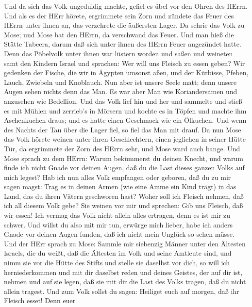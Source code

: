  Und da sich das Volk ungeduldig machte, gefiel es übel vor
den Ohren des HErrn. Und als es der HErr hörete, ergrimmete sein Zorn
und zündete das Feuer des HErrn unter ihnen an, das verzehrete die
äußersten Lager.  Da schrie das Volk zu Mose; und Mose bat
den HErrn, da verschwand das Feuer.  Und man hieß die Stätte
Tabeera, darum daß sich unter ihnen des HErrn Feuer angezündet hatte.
 Denn das Pöbelvolk unter ihnen war lüstern worden und saßen
und weineten samt den Kindern Israel und sprachen: Wer will uns Fleisch
zu essen geben?  Wir gedenken der Fische, die wir in Ägypten
umsonst aßen, und der Kürbisse, Pfeben, Lauch, Zwiebeln und Knoblauch.
 Nun aber ist unsere Seele matt; denn unsere Augen sehen
nichts denn das Man.  Es war aber Man wie Koriandersamen und
anzusehen wie Bedellion.  Und das Volk lief hin und her und
sammelte und stieß es mit Mühlen und zerrieb's in Mörsern und kochte es
in Töpfen und machte ihm Aschenkuchen draus; und es hatte einen
Geschmack wie ein Ölkuchen.  Und wenn des Nachts der Tau
über die Lager fiel, so fiel das Man mit drauf.  Da nun
Mose das Volk hörete weinen unter ihren Geschlechtern, einen jeglichen
in seiner Hütte Tür, da ergrimmete der Zorn des HErrn sehr, und Mose
ward auch bange.  Und Mose sprach zu dem HErrn: Warum
bekümmerst du deinen Knecht, und warum finde ich nicht Gnade vor deinen
Augen, daß du die Last dieses ganzen Volks auf mich legest?
 Hab ich nun alles Volk empfangen oder geboren, daß du zu
mir sagen magst: Trag es in deinen Armen (wie eine Amme ein Kind trägt)
in das Land, das du ihren Vätern geschworen hast?  Woher
soll ich Fleisch nehmen, daß ich all diesem Volk gebe? Sie weinen vor
mir und sprechen: Gib uns Fleisch, daß wir essen!  Ich
vermag das Volk nicht allein alles ertragen, denn es ist mir zu schwer.
 Und willst du also mit mir tun, erwürge mich lieber, habe
ich anders Gnade vor deinen Augen funden, daß ich nicht mein Unglück so
sehen müsse.  Und der HErr sprach zu Mose: Sammle mir
siebenzig Männer unter den Ältesten Israels, die du weißt, daß die
Ältesten im Volk und seine Amtleute sind, und nimm sie vor die Hütte des
Stifts und stelle sie daselbst vor dich,  so will ich
herniederkommen und mit dir daselbst reden und deines Geistes, der auf
dir ist, nehmen und auf sie legen, daß sie mit dir die Last des Volks
tragen, daß du nicht allein tragest.  Und zum Volk sollst
du sagen: Heiliget euch auf morgen, daß ihr Fleisch esset! Denn euer

